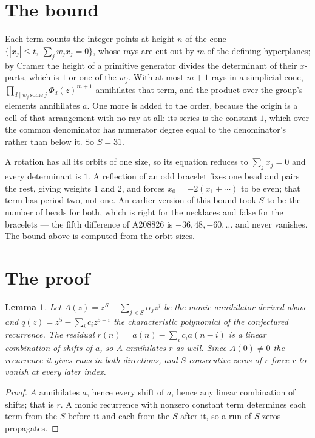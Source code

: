 \documentclass[11pt,a4paper]{article}
\theoremstyle{plain}
\newtheorem{lemma}[theorem]{Lemma}
\theoremstyle{definition}
\begin{document}
\section{The bound}

Each term counts the integer points at height $n$ of the cone
$\{|x_j|\le t,\ \sum_j w_jx_j=0\}$, whose rays are cut out by $m$ of the defining
hyperplanes; by Cramer the height of a primitive generator divides the determinant of their
$x$-parts, which is $1$ or one of the $w_j$. With at most $m+1$ rays in a simplicial cone,
$\prod_{d\mid w_j\ \text{some}\ j}\Phi_d(z)^{m+1}$ annihilates that term, and the product
over the group's elements annihilates $a$. One more is added to the order, because the origin
is a cell of that arrangement with no ray at all: its series is the constant $1$, which over
the common denominator has numerator degree equal to the denominator's rather than below it.
So $S=31$.

A rotation has all its orbits of one size, so its equation reduces to $\sum_jx_j=0$ and every
determinant is $1$. A reflection of an odd bracelet fixes one bead and pairs the rest, giving
weights $1$ and $2$, and forces $x_0=-2(x_1+\cdots)$ to be even; that term has period two, not
one. An earlier version of this bound took $S$ to be the number of beads for both, which is
right for the necklaces and false for the bracelets --- the fifth difference of A208826 is
$-36, 48, -60, \dots$ and never vanishes. The bound above is computed from the orbit sizes.

\section{The proof}

\begin{lemma}\label{lem:crit}
Let $A(z)=z^S-\sum_{j<S}\alpha_jz^{j}$ be the monic annihilator derived above and
$q(z)=z^{5}-\sum_ic_iz^{5-i}$ the characteristic polynomial of the conjectured
recurrence. The residual $r(n)=a(n)-\sum_ic_ia(n-i)$ is a linear combination of shifts of $a$,
so $A$ annihilates $r$ as well. Since $A(0)\ne0$ the recurrence it gives runs in both
directions, and $S$ consecutive zeros of $r$ force $r$ to vanish at every later index.
\end{lemma}

\begin{proof}
$A$ annihilates $a$, hence every shift of $a$, hence any linear combination of shifts; that is
$r$. A monic recurrence with nonzero constant term determines each term from the $S$ before it
and each from the $S$ after it, so a run of $S$ zeros propagates.
\end{proof}
\end{document}

